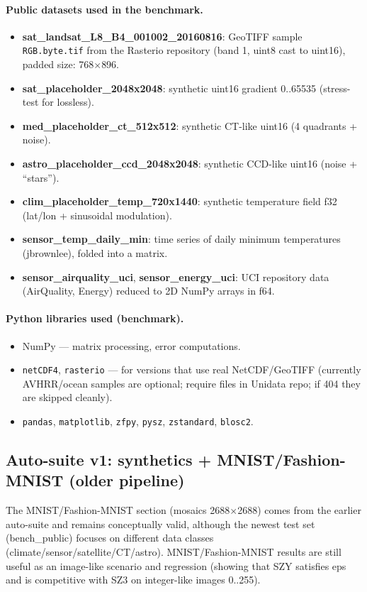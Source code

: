 \documentclass[11pt,a4paper]{article}
\begin{document}
\paragraph{Public datasets used in the benchmark.}
\begin{itemize}
  \item \textbf{sat\_landsat\_L8\_B4\_001002\_20160816}:
        GeoTIFF sample \texttt{RGB.byte.tif} from the Rasterio repository (band 1, uint8 cast to uint16),
        padded size: 768$\times$896.
  \item \textbf{sat\_placeholder\_2048x2048}:
        synthetic uint16 gradient 0..65535 (stress-test for lossless).
  \item \textbf{med\_placeholder\_ct\_512x512}:
        synthetic CT-like uint16 (4 quadrants + noise).
  \item \textbf{astro\_placeholder\_ccd\_2048x2048}:
        synthetic CCD-like uint16 (noise + ``stars'').
  \item \textbf{clim\_placeholder\_temp\_720x1440}:
        synthetic temperature field f32 (lat/lon + sinusoidal modulation).
  \item \textbf{sensor\_temp\_daily\_min}:
        time series of daily minimum temperatures (jbrownlee), folded into a matrix.
  \item \textbf{sensor\_airquality\_uci}, \textbf{sensor\_energy\_uci}:
        UCI repository data (AirQuality, Energy) reduced to 2D NumPy arrays in f64.
\end{itemize}

\paragraph{Python libraries used (benchmark).}
\begin{itemize}
  \item NumPy --- matrix processing, error computations.
  \item \texttt{netCDF4}, \texttt{rasterio} --- for versions that use real NetCDF/GeoTIFF (currently AVHRR/ocean samples are optional; require files in Unidata repo; if 404 they are skipped cleanly).
  \item \texttt{pandas}, \texttt{matplotlib}, \texttt{zfpy}, \texttt{pysz}, \texttt{zstandard}, \texttt{blosc2}.
\end{itemize}

\subsection{Auto-suite v1: synthetics + MNIST/Fashion-MNIST (older pipeline)}
The MNIST/Fashion-MNIST section (mosaics 2688$\times$2688) comes from the earlier auto-suite and remains conceptually valid, although the newest test set (bench\_public) focuses on different data classes (climate/sensor/satellite/CT/astro). MNIST/Fashion-MNIST results are still useful as an image-like scenario and regression (showing that SZY satisfies eps and is competitive with SZ3 on integer-like images 0..255).
\end{document}
